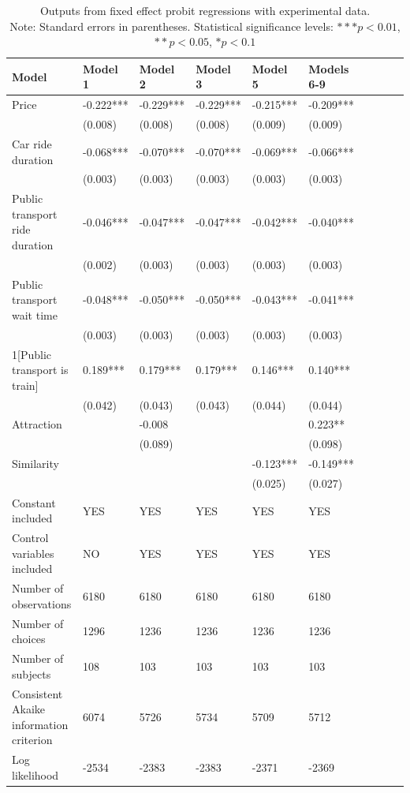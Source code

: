 \documentclass[a4paper,12pt]{article}
\begin{document}
\clearpage
\newpage
\clearpage
\begin{table}
    \centering
    \scriptsize
    \begin{tabular}{p{5.3cm}*{9}{p{1.5cm}}}
    \toprule
    Model & Model 1 & Model 2 & Model 3 & Model 5 & Models 6-9 \\
    \midrule
    Price & -0.222*** & -0.229*** & -0.229*** & -0.215*** & -0.209*** \\
     & (0.008) & (0.008) & (0.008) & (0.009) & (0.009) \\
    Car ride duration & -0.068*** & -0.070*** & -0.070*** & -0.069*** & -0.066*** \\
     & (0.003) & (0.003) & (0.003) & (0.003) & (0.003) \\
    Public transport ride duration & -0.046*** & -0.047*** & -0.047*** & -0.042*** & -0.040*** \\
     & (0.002) & (0.003) & (0.003) & (0.003) & (0.003) \\
    Public transport wait time & -0.048*** & -0.050*** & -0.050*** & -0.043*** & -0.041*** \\
     & (0.003) & (0.003) & (0.003) & (0.003) & (0.003) \\
    1[Public transport is train] & 0.189*** & 0.179*** & 0.179*** & 0.146*** & 0.140*** \\
     & (0.042) & (0.043) & (0.043) & (0.044) & (0.044) \\
    Attraction & & -0.008 & & & 0.223** \\
     & & (0.089) & & & (0.098) \\
    Similarity & & & & -0.123*** & -0.149*** \\
     & & & & (0.025) & (0.027) \\
    Constant included & YES & YES & YES & YES & YES \\
    Control variables included & NO & YES & YES & YES & YES \\
    Number of observations & 6180 & 6180 & 6180 & 6180 & 6180 \\
    Number of choices & 1296 & 1236 & 1236 & 1236 & 1236 \\
    Number of subjects & 108 & 103 & 103 & 103 & 103 \\
    Consistent Akaike information criterion & 6074 & 5726 & 5734 & 5709 & 5712 \\
    Log likelihood & -2534 & -2383 & -2383 & -2371 & -2369 \\

    \bottomrule
    \end{tabular}
    \caption{Outputs from fixed effect probit regressions with experimental data.\\ Note: Standard errors in parentheses. Statistical significance levels: $*** p<0.01$, $** p<0.05$, $* p<0.1$}
    \label{tab:fixedProbitExperimentalData}
\end{table}
\clearpage
\newpage

\section{}
\end{document}

